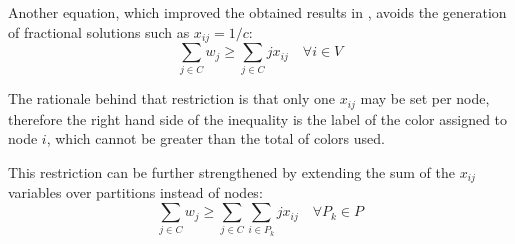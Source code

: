 Another equation, which improved the obtained results in \cite{mendez2006branch}, avoids the generation of fractional solutions such as $x_{ij} = 1/c$:
\begin{equation}
\label{eqn:wjgeqsumnode}
\sum_{j \in C} w_j \geq \sum_{j \in C} j x_{ij} \quad \forall i \in V
\end{equation}

The rationale behind that restriction is that only one $x_{ij}$ may be set per node, therefore the right hand side of the inequality is the label of the color assigned to node $i$, which cannot be greater than the total of colors used.

This restriction can be further strengthened by extending the sum of the $x_{ij}$ variables over partitions instead of nodes:
\begin{equation}
\label{eqn:wjgeqsumpart}
\sum_{j \in C} w_j \geq \sum_{j \in C} \sum_{i \in P_k} j x_{ij} \quad \forall P_k \in P
\end{equation}
